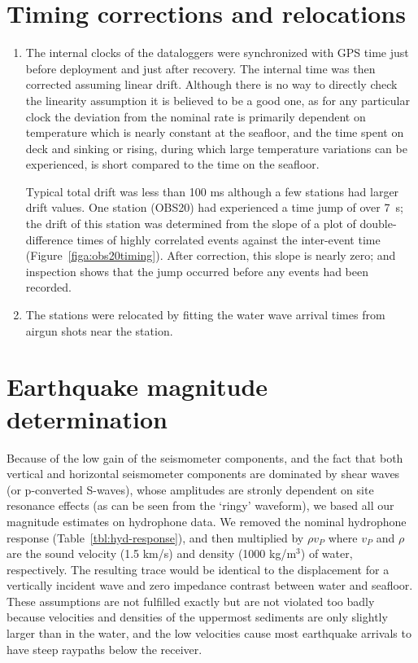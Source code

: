 \documentclass[reviewcopy]{elsart}
\begin{document}
\section{Timing corrections and relocations}

\begin{enumerate}
\item 
The internal clocks of the dataloggers were synchronized with GPS time
just before deployment and just after recovery. The internal time was
then corrected assuming linear drift.  Although there is no way to
directly check the linearity assumption it is believed to be a good
one, as for any particular clock the deviation from the nominal rate
is primarily dependent on temperature which is nearly constant at the
seafloor, and the time spent on deck and sinking or rising, during
which large temperature variations can be experienced, is short
compared to the time on the seafloor.

 Typical total drift was less than
100 ms although a few stations had larger drift values.  One station
(OBS20) had experienced a time jump of over 7~s; 
the drift of this
station was determined from the slope of a plot of double-difference
times of highly correlated events against the inter-event time
(Figure~\ref{figa:obs20timing}).  After correction, this slope is
nearly zero; and inspection shows that the jump occurred before any
events had been recorded. 
 
\item The stations were relocated by fitting the water wave arrival
times from airgun shots near the station. 
\end{enumerate}


\section{Earthquake magnitude determination}
\label{sec:magnitude}

Because of the low gain of the seismometer components, and the fact
that both vertical and horizontal seismometer components are dominated
by shear waves (or p-converted S-waves), whose amplitudes are stronly
dependent on site resonance effects (as can be seen from the `ringy'
waveform), we based all our magnitude estimates on hydrophone data.
We removed the nominal hydrophone response
(Table~\ref{tbl:hyd-response}), and then multiplied by
$\rho v_P$ where $v_P$ and $\rho$ are the sound velocity (1.5 km/s)
and density (1000 kg/m$^3$)
of water, respectively. The resulting trace would be identical to the
displacement for a vertically incident wave and zero impedance contrast
between water and seafloor.  These assumptions are not fulfilled
exactly but are not violated too badly because velocities and
densities of the uppermost sediments are only slightly larger than in
the water, and the low velocities cause most earthquake arrivals to
have steep raypaths below the receiver.  
\end{document}
